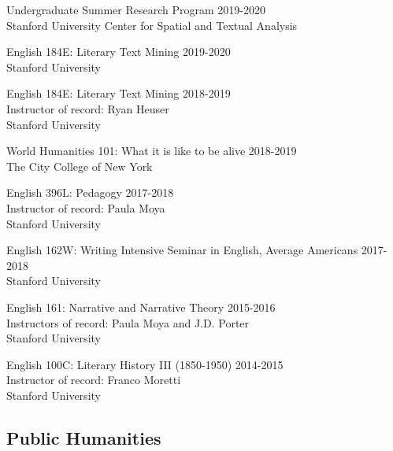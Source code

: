 \documentclass[
  12pt,
  letterpaper,
]{article}
\begin{document}
Undergraduate Summer Research Program \hfill 2019-2020\\
\hspace*{0.333em} Stanford University Center for Spatial and Textual
Analysis

English 184E: Literary Text Mining \hfill 2019-2020\\
\hspace*{0.333em} Stanford University

English 184E: Literary Text Mining \hfill 2018-2019\\
\hspace*{0.333em} Instructor of record: Ryan Heuser\\
\hspace*{0.333em} Stanford University

World Humanities 101: What it is like to be alive \hfill 2018-2019\\
\hspace*{0.333em} The City College of New York

English 396L: Pedagogy \hfill 2017-2018\\
\hspace*{0.333em} Instructor of record: Paula Moya\\
\hspace*{0.333em} Stanford University

English 162W: Writing Intensive Seminar in English, Average Americans
\hfill 2017-2018\\
\hspace*{0.333em} Stanford University

English 161: Narrative and Narrative Theory \hfill 2015-2016\\
\hspace*{0.333em} Instructors of record: Paula Moya and J.D. Porter\\
\hspace*{0.333em} Stanford University

English 100C: Literary History III (1850-1950) \hfill 2014-2015\\
\hspace*{0.333em} Instructor of record: Franco Moretti\\
\hspace*{0.333em} Stanford University

\hypertarget{public-humanities}{%
\subsection{Public Humanities}\label{public-humanities}}
\end{document}
